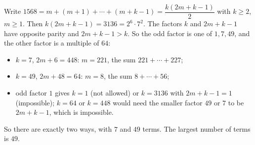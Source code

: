 Write \(1568=m+(m+1)+\cdots+(m+k-1)=\dfrac{k(2m+k-1)}{2}\) with \(k\ge 2\), \(m\ge 1\). Then \(k(2m+k-1)=3136=2^6\cdot 7^2\). The factors \(k\) and \(2m+k-1\) have opposite parity and \(2m+k-1>k\). So the odd factor is one of \(1,7,49\), and the other factor is a multiple of \(64\):
\begin{itemize}
\item \(k=7\), \(2m+6=448\): \(m=221\), the sum \(221+\cdots+227\);
\item \(k=49\), \(2m+48=64\): \(m=8\), the sum \(8+\cdots+56\);
\item odd factor \(1\) gives \(k=1\) (not allowed) or \(k=3136\) with \(2m+k-1=1\) (impossible); \(k=64\) or \(k=448\) would need the smaller factor \(49\) or \(7\) to be \(2m+k-1\), which is impossible.
\end{itemize}
So there are exactly two ways, with \(7\) and \(49\) terms. The largest number of terms is \(\boxed{49}\).
